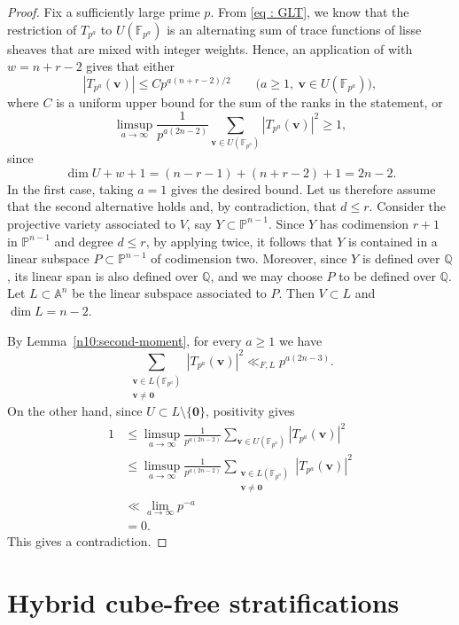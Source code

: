 \documentclass[a4paper,11pt, twoside,reqno]{amsart}
\theoremstyle{plain}
\theoremstyle{definition}
\theoremstyle{remark}
\newcommand{\bfv}{\bm{v}}
\newcommand{\QQ}{\mathbb{Q}}
\renewcommand{\le}{\leqslant}
\renewcommand{\ge}{\geqslant}
\newcommand{\FF}{\mathbb{F}}
\numberwithin{equation}{section}
\begin{document}
\begin{proof}
Fix a sufficiently large prime $p$.
From \eqref{eq : GLT}, we know that the restriction of
$T_{p^a}$ to $U(\FF_{p^a})$ is an alternating sum of
trace functions of lisse sheaves that are mixed with
integer weights.
Hence, an application of
\cite[Theorem~3.5 and Remark~3.6]{Xu20}
with $w=n+r-2$ gives that either
\[
|T_{p^a}(\bfv)|\le Cp^{a(n+r-2)/2}
\qquad
\bigl(a\ge1,\ \bfv\in U(\FF_{p^a})\bigr),
\]
where $C$ is a uniform upper bound for the sum of the
ranks in the statement, or
\[
\limsup_{a\to\infty}
\frac{1}{p^{a(2n-2)}}
\sum_{\bfv\in U(\FF_{p^a})}
|T_{p^a}(\bfv)|^2
\ge1,
\]
since
\[
\dim U+w+1
=(n-r-1)+(n+r-2)+1
=2n-2.
\]
In the first case, taking $a=1$ gives the desired bound.
Let us therefore assume that the second alternative holds and,
by contradiction, that $d\le r$.
Consider the projective variety associated to $V$, say
$Y\subset\mathbb{P}^{n-1}$.
Since $Y$ has codimension $r+1$ in $\mathbb{P}^{n-1}$ and
degree $d\le r$, by applying
\cite[Lemma~3 and Corollary]{Swi73} twice, it follows that
$Y$ is contained in a linear subspace
$P\subset\mathbb{P}^{n-1}$ of codimension two.
Moreover, since $Y$ is defined over $\QQ$, its linear span
is also defined over $\QQ$, and we may choose $P$ to be
defined over $\QQ$.
Let $L\subset\mathbb{A}^{n}$ be the linear subspace
associated to $P$.
Then $V\subset L$ and $\dim L=n-2$.

By Lemma~\ref{n10:second-moment}, for every $a\ge1$ we have
\[
\sum_{\substack{
\bfv\in L(\FF_{p^a})\\
\bfv\ne\bm0}}
|T_{p^a}(\bfv)|^2
\ll_{F,L}p^{a(2n-3)}.
\]
On the other hand, since
$U\subset L\setminus\{\bm0\}$, positivity gives
\[
\begin{split}
1
&\le
\limsup_{a\to\infty}
\frac{1}{p^{a(2n-2)}}
\sum_{\bfv\in U(\FF_{p^a})}
|T_{p^a}(\bfv)|^2 \\
&\le
\limsup_{a\to\infty}
\frac{1}{p^{a(2n-2)}}
\sum_{\substack{
\bfv\in L(\FF_{p^a})\\
\bfv\ne\bm0}}
|T_{p^a}(\bfv)|^2
\\
&\ll \lim_{a\rightarrow\infty} p^{-a}
\\& =0.
\end{split}
\]
This gives a contradiction.
\end{proof}





\section{Hybrid cube-free stratifications}
\label{sec:MarkV-construction}
\end{document}
